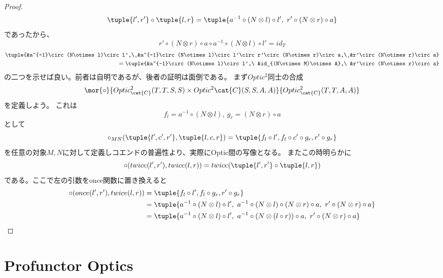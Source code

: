 \documentclass[uplatex,dvipdfmx]{jsarticle}
\begin{document}
  \begin{proof}
    \[\tuple{l',r'}\circ\tuple{l,r}=\tuple{a^{-1}\circ(N\otimes l)\circ l',\ r'\circ(N\otimes r)\circ a}\]であったから、
    \[r'\circ(N\otimes r)\circ a\circ a^{-1}\circ(N\otimes l)\circ l'=id_T\]
    \begin{alignat*}{2}
      \tuple{&a^{-1}\circ(N\otimes l)\circ l',\ &a^{-1}\circ(N\otimes l)\circ l'\circ r'\circ(N\otimes r)\circ a,\ &r'\circ(N\otimes r)\circ a}\\
      =\tuple{&a^{-1}\circ(N\otimes l)\circ l',\ &id_{(N\otimes M)\otimes A},\ &r'\circ(N\otimes r)\circ a}
    \end{alignat*}
    の二つを示せば良い。前者は自明であるが、後者の証明は面倒である。
    まず$Optic^2$同士の合成\[\mor{\circ}{Optic^2_\cat{C}(T,T,S,S)\times Optic^2\cat{C}(S,S,A,A)}{Optic^2_\cat{C}(T,T,A,A)}\]を定義しよう。
    これは\[f_l = a^{-1}\circ(N\otimes l), \ g_r = (N\otimes r)\circ a\]として
    \[\circ_{MN} (\tuple{l',c',r'},\tuple{l,c,r}) =\tuple{f_l\circ l',f_l\circ c'\circ g_r, r'\circ g_r}\]を任意の対象$M,N$に対して定義しコエンドの普遍性より、実際にOptic間の写像となる。
    またこの時明らかに\[\circ (twice(l',r'),twice(l,r)) = twice(\tuple{l',r'}\circ\tuple{l,r})\]である。ここで左の引数をonce関数に置き換えると
    \begin{align*}
      \circ (once(l',r'),twice(l,r)) &=  \tuple{f_l\circ l',f_l\circ g_r, r'\circ g_r}\\
      &=\tuple{a^{-1}\circ(N\otimes l)\circ l',\ a^{-1}\circ(N\otimes l)\circ(N\otimes r)\circ a,\ r'\circ(N\otimes r)\circ a}\\
      &=\tuple{a^{-1}\circ(N\otimes l)\circ l',\ a^{-1}\circ(N\otimes (l\circ r))\circ a,\ r'\circ(N\otimes r)\circ a}
    \end{align*}

  \end{proof}
  \section{Profunctor Optics}
\end{document}
